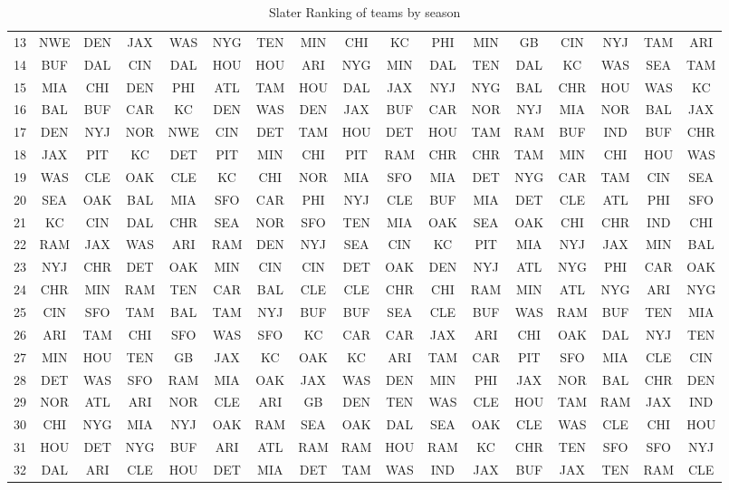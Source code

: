 \documentclass[11pt]{article}
\begin{document}
\begin{table}[!htb]
\begin{center}
\begin{tabular}{|c|c|c|c|c|c|c|c|c|c|c|c|c|c|c|c|c|}
13 & NWE & DEN & JAX & WAS & NYG & TEN & MIN & CHI & KC & PHI & MIN & GB & CIN & NYJ & TAM & ARI\\
14 & BUF & DAL & CIN & DAL & HOU & HOU & ARI & NYG & MIN & DAL & TEN & DAL & KC & WAS & SEA & TAM\\
15 & MIA & CHI & DEN & PHI & ATL & TAM & HOU & DAL & JAX & NYJ & NYG & BAL & CHR & HOU & WAS & KC\\
16 & BAL & BUF & CAR & KC & DEN & WAS & DEN & JAX & BUF & CAR & NOR & NYJ & MIA & NOR & BAL & JAX\\
17 & DEN & NYJ & NOR & NWE & CIN & DET & TAM & HOU & DET & HOU & TAM & RAM & BUF & IND & BUF & CHR\\
18 & JAX & PIT & KC & DET & PIT & MIN & CHI & PIT & RAM & CHR & CHR & TAM & MIN & CHI & HOU & WAS\\
19 & WAS & CLE & OAK & CLE & KC & CHI & NOR & MIA & SFO & MIA & DET & NYG & CAR & TAM & CIN & SEA\\
20 & SEA & OAK & BAL & MIA & SFO & CAR & PHI & NYJ & CLE & BUF & MIA & DET & CLE & ATL & PHI & SFO\\
21 & KC & CIN & DAL & CHR & SEA & NOR & SFO & TEN & MIA & OAK & SEA & OAK & CHI & CHR & IND & CHI\\
22 & RAM & JAX & WAS & ARI & RAM & DEN & NYJ & SEA & CIN & KC & PIT & MIA & NYJ & JAX & MIN & BAL\\
23 & NYJ & CHR & DET & OAK & MIN & CIN & CIN & DET & OAK & DEN & NYJ & ATL & NYG & PHI & CAR & OAK\\
24 & CHR & MIN & RAM & TEN & CAR & BAL & CLE & CLE & CHR & CHI & RAM & MIN & ATL & NYG & ARI & NYG\\
25 & CIN & SFO & TAM & BAL & TAM & NYJ & BUF & BUF & SEA & CLE & BUF & WAS & RAM & BUF & TEN & MIA\\
26 & ARI & TAM & CHI & SFO & WAS & SFO & KC & CAR & CAR & JAX & ARI & CHI & OAK & DAL & NYJ & TEN\\
27 & MIN & HOU & TEN & GB & JAX & KC & OAK & KC & ARI & TAM & CAR & PIT & SFO & MIA & CLE & CIN\\
28 & DET & WAS & SFO & RAM & MIA & OAK & JAX & WAS & DEN & MIN & PHI & JAX & NOR & BAL & CHR & DEN\\
29 & NOR & ATL & ARI & NOR & CLE & ARI & GB & DEN & TEN & WAS & CLE & HOU & TAM & RAM & JAX & IND\\
30 & CHI & NYG & MIA & NYJ & OAK & RAM & SEA & OAK & DAL & SEA & OAK & CLE & WAS & CLE & CHI & HOU\\
31 & HOU & DET & NYG & BUF & ARI & ATL & RAM & RAM & HOU & RAM & KC & CHR & TEN & SFO & SFO & NYJ\\
32 & DAL & ARI & CLE & HOU & DET & MIA & DET & TAM & WAS & IND & JAX & BUF & JAX & TEN & RAM & CLE\\
\hline
\end{tabular}
\caption{Slater Ranking of teams by season}\label{table:full_slater_ranking}
\end{center}
\end{table}
\end{document}
